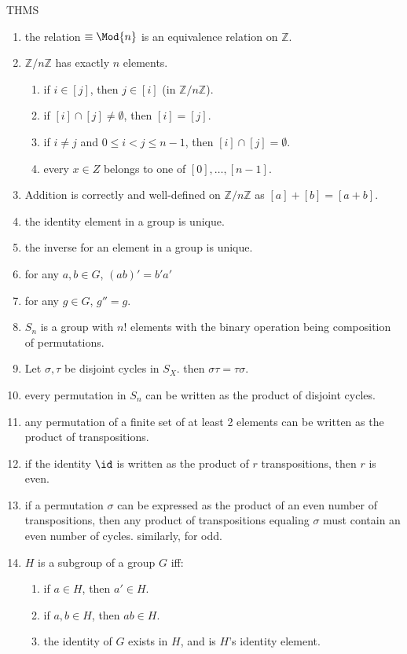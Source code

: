 THMS
\begin{enumerate}
	\item the relation $\equiv \Mod{n}$ is an equivalence relation on $\mathbb{Z}$. 
	\item $\mathbb{Z}/n\mathbb{Z}$ has exactly $n$ elements. 
	\begin{enumerate}
		\item if $i \in [j]$, then $j \in [i]$ (in $\mathbb{Z}/n\mathbb{Z}$). 
		\item if $[i] \cap [j] \neq \emptyset$, then $[i]=[j]$. 
		\item if $i \neq j$ and $0 \leq i < j \leq n-1$, then $[i] \cap [j]=\emptyset$. 
		\item every $x \in Z$ belongs to one of $[0],\dots,[n-1]$. 
	\end{enumerate}
	\item Addition is correctly and well-defined on $\mathbb{Z}/n\mathbb{Z}$ as $[a]+[b] = [a+b]$. 
	\item the identity element in a group is unique. 
	\item the inverse for an element in a group is unique.
	\item for any $a,b \in G$, $(ab)' = b'a'$
	\item for any $g \in G$, $g'' = g$. 
	\item $S_n$ is a group with $n!$ elements with the binary operation being composition of permutations. 
	\item Let $\sigma, \tau$ be disjoint cycles in $S_X$. then $\sigma\tau = \tau\sigma$. 
	\item every permutation in $S_n$ can be written as the product of disjoint cycles. 
	\item any permutation of a finite set of at least 2 elements can be written as the product of transpositions. 
	\item if the identity $\id$ is written as the product of $r$ transpositions, then $r$ is even. 
	\item if a permutation $\sigma$ can be expressed as the product of an even number of transpositions, then any product of transpositions equaling $\sigma$ must contain an even number of cycles. similarly, for odd. 
	\item $H$ is a subgroup of a group $G$ iff: 
	\begin{enumerate}
		\item if $a \in H$, then $a' \in H$. 
		\item if $a,b \in H$, then $ab \in H$. 
		\item the identity of $G$ exists in $H$, and is $H$'s identity element. 

\end{enumerate}
\end{enumerate}
